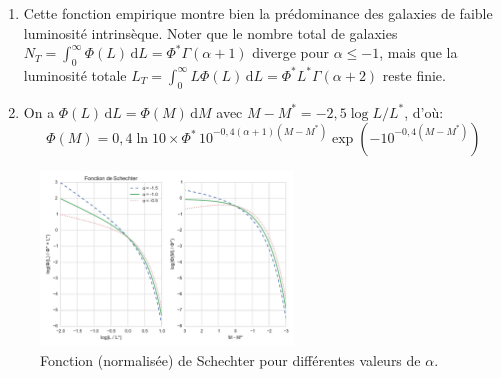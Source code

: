 \documentclass[a4paper,10pt]{report}
\renewcommand{\d}{\ensuremath{\mathrm{d}}}
\begin{document}
\begin{Answer}
  \begin{enumerate}
  \item Cette fonction empirique montre bien la prédominance des
    galaxies de faible luminosité intrinsèque. Noter que le nombre
    total de galaxies $N_{T} = \int_{0}^{\infty} \Phi(L)\,\d L =
    \Phi^{*}\Gamma(\alpha+1)$ diverge pour $\alpha \leq -1$, mais que
    la luminosité totale $L_{T} = \int_{0}^{\infty} L\Phi(L)\,\d L =
    \Phi^{*}L^{*}\Gamma(\alpha+2)$ reste finie.
  \item On a $\Phi(L)\,\d L = \Phi(M)\,\d M$ avec $M - M^{*} = -2,5\log
    L/L^{*}$, d'où:
    $$
    \Phi(M) = 0,4 \ln 10\times \Phi^{*}\,10^{-0,4(\alpha
      +1)(M-M^{*})}\exp \left( -10^{-0,4(M-M^{*})} \right)
    $$
  \end{enumerate}

  \begin{figure}%
    \centering
    \includegraphics[width=0.6\textwidth]{schechter}
    \caption{Fonction (normalisée) de Schechter pour différentes
      valeurs de $\alpha$.}
    \label{schechter}
  \end{figure}
\end{Answer}

\end{document}
